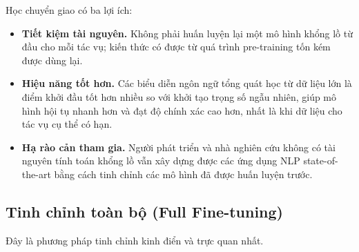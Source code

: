 Học chuyển giao có ba lợi ích:
\begin{itemize}
    \item \textbf{Tiết kiệm tài nguyên.} Không phải huấn luyện lại một mô hình khổng lồ từ đầu cho mỗi tác vụ; kiến thức có được từ quá trình pre-training tốn kém được dùng lại.
    \item \textbf{Hiệu năng tốt hơn.} Các biểu diễn ngôn ngữ tổng quát học từ dữ liệu lớn là điểm khởi đầu tốt hơn nhiều so với khởi tạo trọng số ngẫu nhiên, giúp mô hình hội tụ nhanh hơn và đạt độ chính xác cao hơn, nhất là khi dữ liệu cho tác vụ cụ thể có hạn.
    \item \textbf{Hạ rào cản tham gia.} Người phát triển và nhà nghiên cứu không có tài nguyên tính toán khổng lồ vẫn xây dựng được các ứng dụng NLP state-of-the-art bằng cách tinh chỉnh các mô hình đã được huấn luyện trước.
\end{itemize}

\subsection{Tinh chỉnh toàn bộ (Full Fine-tuning)}
\label{ssec:full_finetuning}

Đây là phương pháp tinh chỉnh kinh điển và trực quan nhất.

